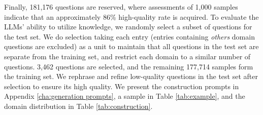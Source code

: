 \begin{CJK*}{UTF8}{gbsn}
\begin{table}[!b]
  \centering
  \caption{Each sample in FactualBench contains a question $Q_i$, a standard answer $X_i^0$, 3 wrong answers $\{X_i^j\}$ and a domain $D_i$ it belongs to. The English translation is for reference. Appendix \ref{cha:more examples} presents more examples.}
  \label{tab:example}
\end{table}
\end{CJK*}

Finally, 181,176 questions are reserved, where assessments of 1,000 samples indicate that an approximately 86\% high-quality rate is acquired. To evaluate the LLMs' ability to utilize knowledge, we randomly select a subset of questions for the test set. We do selection taking each entry (entries containing \textit{others} domain questions are excluded) as a unit to maintain that all questions in the test set are separate from the training set, and restrict each domain to a similar number of questions. 3,462 questions are selected, and the remaining 177,714 samples form the training set. We rephrase and refine low-quality questions in the test set after selection to ensure its high quality. We present the construction prompts in Appendix \ref{cha:generation prompts}, a sample in Table \ref{tab:example}, and the domain distribution in Table \ref{tab:construction}.

